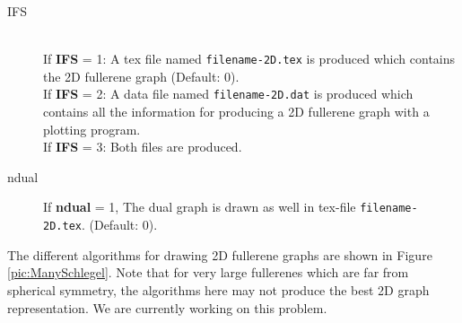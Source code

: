\documentclass[article,a4paper,twoside]{memoir}
\newcommand{\filename}[1]{\texttt{#1}}
\newcommand{\paramname}[1]{{\color{green}\textbf{#1}}}
\begin{document}
\begin{description}
\item[IFS]\ \\
If \paramname{IFS} = 1: A tex file named \filename{filename-2D.tex} is produced which contains the 2D fullerene graph (Default: 0).\\
If \paramname{IFS} = 2: A data file named \filename{filename-2D.dat} is produced which contains all the information 
for producing a 2D fullerene graph with a plotting program.\\
If \paramname{IFS} = 3: Both files are produced.
\item[ndual] 
If \paramname{ndual} = 1, The dual graph is drawn as well in tex-file \filename{filename-2D.tex}. (Default: 0).\\
\end{description}

The different algorithms for drawing 2D fullerene graphs are shown in Figure \ref{pic:ManySchlegel}. Note that for very large
fullerenes which are far from spherical symmetry, the algorithms here may not produce the best 2D graph representation.
We are currently working on this problem.
\end{document}
